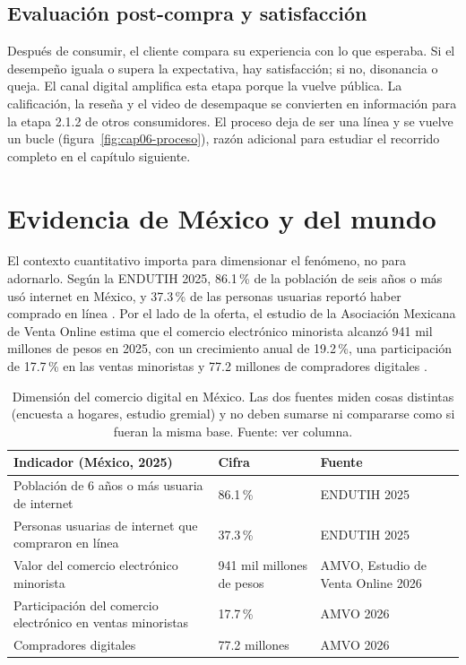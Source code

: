 \subsection{Evaluación post-compra y satisfacción}

Después de consumir, el cliente compara su experiencia con lo que esperaba.
Si el desempeño iguala o supera la expectativa, hay satisfacción; si no,
disonancia o queja. El canal digital amplifica esta etapa porque la vuelve
pública. La calificación, la reseña y el video de desempaque se convierten en
información para la etapa 2.1.2 de otros consumidores. El proceso deja de ser
una línea y se vuelve un bucle (figura~\ref{fig:cap06-proceso}), razón
adicional para estudiar el recorrido completo en el capítulo siguiente.

\section{Evidencia de México y del mundo}

El contexto cuantitativo importa para dimensionar el fenómeno, no para
adornarlo. Según la ENDUTIH 2025, 86.1\,\% de la población de seis años o más
usó internet en México, y 37.3\,\% de las personas usuarias reportó haber
comprado en línea \parencite{inegi2026endutih}. Por el lado de la oferta, el
estudio de la Asociación Mexicana de Venta Online estima que el comercio
electrónico minorista alcanzó 941 mil millones de pesos en 2025, con un
crecimiento anual de 19.2\,\%, una participación de 17.7\,\% en las ventas
minoristas y 77.2 millones de compradores digitales \parencite{amvo2026}.

\begin{table}[!htb]
\centering
\begin{tabular}{@{}p{5.6cm}p{2.4cm}p{4.5cm}@{}}
\toprule
Indicador (México, 2025) & Cifra & Fuente \\
\midrule
Población de 6 años o más usuaria de internet & 86.1\,\% & ENDUTIH 2025 \parencite{inegi2026endutih} \\
Personas usuarias de internet que compraron en línea & 37.3\,\% & ENDUTIH 2025 \parencite{inegi2026endutih} \\
Valor del comercio electrónico minorista & 941 mil millones de pesos & AMVO, Estudio de Venta Online 2026 \parencite{amvo2026} \\
Participación del comercio electrónico en ventas minoristas & 17.7\,\% & AMVO 2026 \parencite{amvo2026} \\
Compradores digitales & 77.2 millones & AMVO 2026 \parencite{amvo2026} \\
\bottomrule
\end{tabular}
\caption{Dimensión del comercio digital en México. Las dos fuentes miden
cosas distintas (encuesta a hogares, estudio gremial) y no deben sumarse ni
compararse como si fueran la misma base. Fuente: ver columna.}
\label{tab:cap06-mexico}
\end{table}

